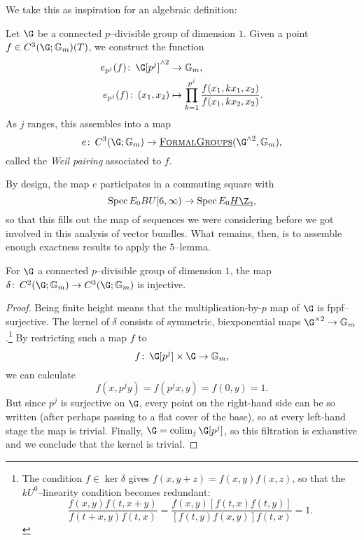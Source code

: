 We take this as inspiration for an algebraic definition:

\begin{definition}
Let $\G$ be a connected $p$--divisible group of dimension $1$.  Given a point $f \in C^3(\G; \Gm)(T)$, we construct the function
\begin{align*}
e_{p^j}(f)\co \G[p^j]^{\sm 2} & \to \Gm, \\
e_{p^j}(f)\co (x_1, x_2) & \mapsto \prod_{k=1}^{p^j} \frac{f(x_1, kx_1, x_2)}{f(x_1, kx_2, x_2)}.
\end{align*}
As $j$ ranges, this assembles into a map \[e\co C^3(\G; \Gm) \to \InternalHom{FormalGroups}(\G^{\sm 2}, \Gm),\] called the \textit{Weil pairing} associated to $f$.
\end{definition}

By design, the map $e$ participates in a commuting square with \[\Spec E_0 BU[6, \infty) \to \Spec E_0 \OS{H\Z}{3},\] so that this fills out the map of sequences we were considering before we got involved in this analysis of vector bundles.  What remains, then, is to assemble enough exactness results to apply the $5$--lemma.

\begin{lemma}
For $\G$ a connected $p$--divisible group of dimension $1$, the map $\delta\co C^2(\G; \Gm) \to C^3(\G; \Gm)$ is injective.
\end{lemma}
\begin{proof}
Being finite height means that the multiplication-by-$p$ map of $\G$ is fppf--surjective.  The kernel of $\delta$ consists of symmetric, biexponential maps $\G^{\times 2} \to \Gm$.\footnote{The condition $f \in \ker \delta$ gives $f(x, y+z) = f(x, y)f(x, z)$, so that the $kU^0$--linearity condition becomes redundant: \[\frac{f(x, y) f(t, x+y)}{f(t+x, y) f(t, x)} = \frac{f(x, y) [f(t, x) f(t, y)]}{[f(t, y) f(x, y)] f(t, x)} = 1.\]}  By restricting such a map $f$ to \[f \co \G[p^j] \times \G \to \Gm,\] we can calculate \[f(x, p^j y) = f(p^j x, y) = f(0, y) = 1.\]  But since $p^j$ is surjective on $\G$, every point on the right-hand side can be so written (after perhaps passing to a flat cover of the base), so at every left-hand stage the map is trivial.  Finally, $\G = \colim_j \G[p^j]$, so this filtration is exhaustive and we conclude that the kernel is trivial.
\end{proof}

